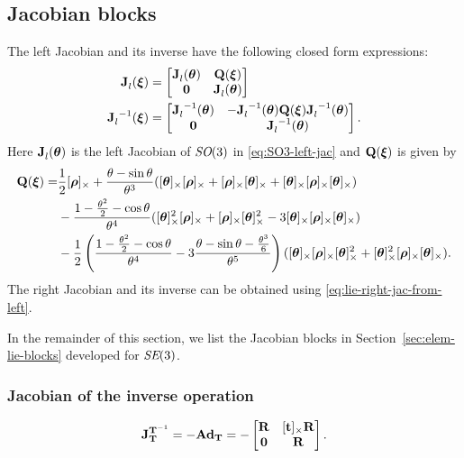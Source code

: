 \subsection{Jacobian blocks} \label{sec:Jacobians-SE3}
The left Jacobian and its inverse have the following closed form expressions: 
\begin{align}
{{\boldsymbol{\mathbf{J}}}^{}_{l}}({\boldsymbol{\mathbf{\xi}}}) &= 
\begin{bmatrix}
  {{\boldsymbol{\mathbf{J}}}^{}_{l}}({\boldsymbol{\mathbf{\theta}}}) & {\boldsymbol{\mathbf{Q}}}({\boldsymbol{\mathbf{\xi}}}) \\
  \boldsymbol{\mathbf{0}} & {{\boldsymbol{\mathbf{J}}}^{}_{l}}({\boldsymbol{\mathbf{\theta}}})
\end{bmatrix}\\
{{\boldsymbol{\mathbf{J}}}^{}_{l}}^{-1}({\boldsymbol{\mathbf{\xi}}}) &= 
\begin{bmatrix}
  {{\boldsymbol{\mathbf{J}}}^{}_{l}}^{-1}({\boldsymbol{\mathbf{\theta}}}) & -{{\boldsymbol{\mathbf{J}}}^{}_{l}}^{-1}({\boldsymbol{\mathbf{\theta}}}) {\boldsymbol{\mathbf{Q}}}({\boldsymbol{\mathbf{\xi}}}) {{\boldsymbol{\mathbf{J}}}^{}_{l}}^{-1}({\boldsymbol{\mathbf{\theta}}}) \\
  \boldsymbol{\mathbf{0}} & {{\boldsymbol{\mathbf{J}}}^{}_{l}}^{-1}({\boldsymbol{\mathbf{\theta}}})
\end{bmatrix}.  \label{eq:jacobian-left-inverse-SE3}
\end{align}
Here ${{\boldsymbol{\mathbf{J}}}^{}_{l}}({\boldsymbol{\mathbf{\theta}}})$ is the left Jacobian of $\textit{SO}(3)$ in \eqref{eq:SO3-left-jac} and ${\boldsymbol{\mathbf{Q}}}({\boldsymbol{\mathbf{\xi}}})$ is given by
%
\newcommand{\rhox}{\skewsymm{\vecrho}}
\newcommand{\thetax}{\skewsymm{\vectheta}}
%
\begin{equation}
\begin{split}
\matQ(\vecxi) =& 
  \frac{1}{2}\rhox 
  + \frac{\theta - \sin\theta}{\theta^3}(\thetax\rhox+\rhox\thetax+\thetax\rhox\thetax)\\
  &- \frac{1 - \frac{\theta^2}{2} - \cos\theta}{\theta^4}(\thetax^2\rhox+\rhox\thetax^2-3\thetax\rhox\thetax)\\
  &-\frac{1}{2}\left(\frac{1 -  \frac{\theta^2}{2} - \cos\theta}{\theta^4} 
                  - 3\frac{\theta-\sin\theta-\frac{\theta^3}{6}}{\theta^5}\right)
                  (\thetax\rhox\thetax^2 + \thetax^2\rhox\thetax).
\end{split}
\end{equation}
%
The right Jacobian and its inverse can be obtained using \eqref{eq:lie-right-jac-from-left}.

In the remainder of this section, we list the Jacobian blocks in Section~\ref{sec:elem-lie-blocks} developed for $\textit{SE}(3)$.

\subsubsection*{Jacobian of the inverse operation}
\begin{equation}
  {{\boldsymbol{\mathbf{J}}}^{{\boldsymbol{\mathbf{T}}}^{-1}}_{{\boldsymbol{\mathbf{T}}}}} = -\boldsymbol{\mathbf{Ad}}_{\boldsymbol{\mathbf{T}}} = -
  \begin{bmatrix}
    {\boldsymbol{\mathbf{R}}} & [{\boldsymbol{\mathbf{t}}}]_\times{\boldsymbol{\mathbf{R}}}\\
    \boldsymbol{\mathbf{0}} & {\boldsymbol{\mathbf{R}}}
  \end{bmatrix}.
\end{equation}

